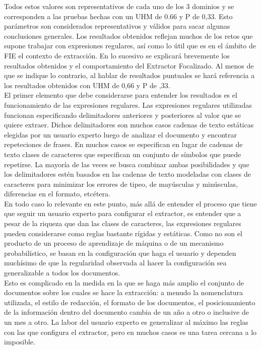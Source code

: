 Todos estos valores son representativos de cada uno de los 3 dominios y se corresponden a las pruebas hechas con un UHM de 0.66 y P de 0,33. Esto parámetros son considerados representativos y válidos para sacar algunas conclusiones generales. Los resultados obtenidos reflejan muchos de los retos que supone trabajar con expresiones regulares, así como lo útil que es en el ámbito de FIE el contexto de extracción.  En lo sucesivo se explicará brevemente los resultados obtenidos y el comportamiento del Extractor Focalizado. Al menos de que se indique lo contrario, al hablar de resultados puntuales se hará referencia a los resultados obtenidos con UHM de 0,66 y P de ,33. \\

El primer elemento que debe considerarse para entender los resultados es el funcionamiento de las expresiones regulares. Las expresiones regulares utilizadas funcionan especificando delimitadores anteriores y posteriores al valor que se quiere extraer. Dichos delimitadores son muchos casos cadenas de texto estáticas elegidas por un usuario experto luego de analizar el documento y encontrar repeteciones de frases. En muchos casos se especifican en lugar de cadenas de texto clases de caracteres que especifican un conjunto de símbolos que puede repetirse. La mayoría de las veces se busca combinar ambas posibilidades y que los delimitadores estén basados en las cadenas de texto modeladas con clases de caracteres para minimizar los errores de tipeo, de mayúsculas y minúsculas, diferencias en el formato, etcétera. \\

En todo caso lo relevante en este punto, más allá de entender el proceso que tiene que seguir un usuario experto para configurar el extractor, es entender que a pesar de la riqueza que dan las clases de caracteres,  las expresiones regulares pueden considerarse como reglas bastante rígidas y estáticas. Como no son el producto de un proceso de aprendizaje de máquina o de un mecanismo probabilístico, se basan en la configuración que haga el usuario y dependen muchísimo de que la regularidad observada al hacer la configuración sea generalizable a todos los documentos. \\

Esto es complicado en la medida en la que se haga más amplio el conjunto de documentos sobre los cuales se hace la extracción: a menudo la nomenclatura utilizada, el estilo de redacción, el formato de los documentos, el posicionamiento de la información dentro del documento cambia de un año a otro o inclusive de un mes a otro. La labor del usuario experto es generalizar al máximo las reglas con las que configura el extractor, pero en muchos casos es una tarea cercana a lo imposible.\\

